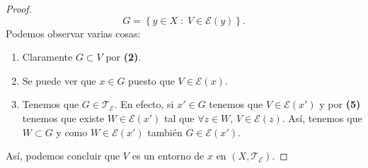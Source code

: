 \begin{proof}
	\[G = \left\{ y \in X \; : \; V \in \mathcal{E}\left(y\right)\right\} .\]
Podemos observar varias cosas:
\begin{enumerate}
\item Claramente $\displaystyle G \subset V $ por \textbf{(2)}. 
\item Se puede ver que $\displaystyle x \in G $ puesto que $\displaystyle V \in \mathcal{E}\left(x\right) $. 
\item Tenemos que $\displaystyle G \in \mathcal{T}_{\mathcal{E}} $. En efecto, si $\displaystyle x' \in G $ tenemos que $\displaystyle V \in \mathcal{E}\left(x'\right) $ y por \textbf{(5)} tenemos que existe $\displaystyle W \in \mathcal{E}\left(x'\right) $ tal que $\displaystyle \forall z \in W $, $\displaystyle V \in \mathcal{E}\left(z\right) $. Así, tenemos que $\displaystyle W \subset G $ y como $\displaystyle W \in \mathcal{E}\left(x'\right) $ también $\displaystyle G \in \mathcal{E}\left(x'\right) $. 
\end{enumerate}
Así, podemos concluir que $\displaystyle V $ es un entorno de $\displaystyle x  $ en $\displaystyle \left(X, \mathcal{T}_{\mathcal{E}}\right) $. 
\end{proof}
